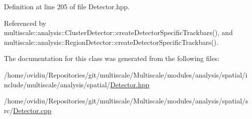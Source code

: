 Definition at line 205 of file Detector.\-hpp.



Referenced by multiscale\-::analysis\-::\-Cluster\-Detector\-::create\-Detector\-Specific\-Trackbars(), and multiscale\-::analysis\-::\-Region\-Detector\-::create\-Detector\-Specific\-Trackbars().



The documentation for this class was generated from the following files\-:\begin{DoxyCompactItemize}
\item 
/home/ovidiu/\-Repositories/git/multiscale/\-Multiscale/modules/analysis/spatial/include/multiscale/analysis/spatial/\hyperlink{Detector_8hpp}{Detector.\-hpp}\item 
/home/ovidiu/\-Repositories/git/multiscale/\-Multiscale/modules/analysis/spatial/src/\hyperlink{Detector_8cpp}{Detector.\-cpp}\end{DoxyCompactItemize}
